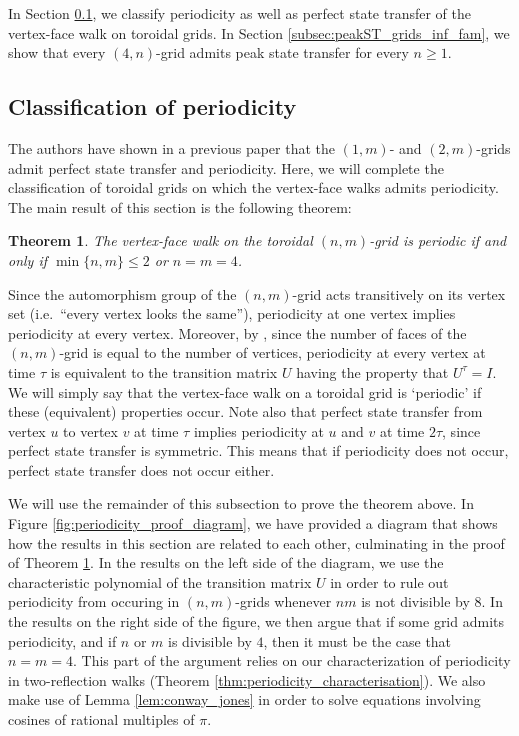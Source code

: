 \documentclass{article}
\newtheorem{theorem}{Theorem}[section]
\numberwithin{equation}{section}
\begin{document}
In Section \ref{subsec:grids_periodicity_classification}, we classify periodicity as well as perfect state transfer of the vertex-face walk on toroidal grids. In Section \ref{subsec:peakST_grids_inf_fam}, we show that every $(4,n)$-grid admits peak state transfer for every $n \geq 1$.

\subsection{Classification of periodicity}
\label{subsec:grids_periodicity_classification}

The authors have shown in a previous paper \cite{GuoSch2024} that the $(1,m)$- and $(2,m)$-grids admit perfect state transfer and periodicity. Here, we will complete the classification of toroidal grids on which the vertex-face walks admits periodicity. The main result of this section is the following theorem:
\begin{theorem}
\label{thm:toroidal_periodicity_characterisation}
The vertex-face walk on the toroidal $(n,m)$-grid is periodic if and only if $\min\{n,m\} \leq 2$ or $n = m = 4$.
\end{theorem}
Since the automorphism group of the $(n,m)$-grid acts transitively on its vertex set (i.e.\ ``every vertex looks the same''), periodicity at one vertex implies periodicity at every vertex. Moreover, by \cite[Theorem 5.2]{GuoSch2024}, since the number of faces of the $(n,m)$-grid is equal to the number of vertices, periodicity at every vertex at time $\tau$ is equivalent to the transition matrix $U$ having the property that $U^\tau = I$. We will simply say that the vertex-face walk on a toroidal grid is `periodic' if these (equivalent) properties occur. Note also that perfect state transfer from vertex $u$ to vertex $v$ at time $\tau$ implies periodicity at $u$ and $v$ at time $2\tau$, since perfect state transfer is symmetric. This means that if periodicity does not occur, perfect state transfer does not occur either.

We will use the remainder of this subsection to prove the theorem above. In Figure \ref{fig:periodicity_proof_diagram}, we have provided a diagram that shows how the results in this section are related to each other, culminating in the proof of Theorem \ref{thm:toroidal_periodicity_characterisation}. In the results on the left side of the diagram, we use the characteristic polynomial of the transition matrix $U$ in order to rule out periodicity from occuring in $(n,m)$-grids whenever $nm$ is not divisible by $8$. In the results on the right side of the figure, we then argue that if some grid admits periodicity, and if $n$ or $m$ is divisible by $4$, then it must be the case that $n = m = 4$. This part of the argument relies on our characterization of periodicity in two-reflection walks (Theorem \ref{thm:periodicity_characterisation}). We also make use of Lemma \ref{lem:conway_jones} in order to solve equations involving cosines of rational multiples of $\pi$.
\end{document}
